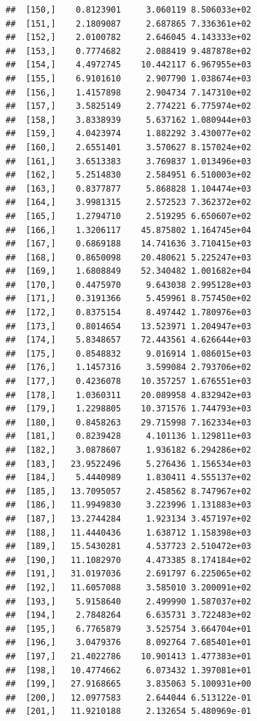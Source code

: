 \documentclass[article]{jss}\usepackage[]{graphicx}\usepackage[]{xcolor}
\makeatletter
\newenvironment{kframe}{%
 \def\at@end@of@kframe{}%
 \ifinner\ifhmode%
  \def\at@end@of@kframe{\end{minipage}}%
  \begin{minipage}{\columnwidth}%
 \fi\fi%
 \def\FrameCommand##1{\hskip\@totalleftmargin \hskip-\fboxsep
 \colorbox{shadecolor}{##1}\hskip-\fboxsep
     \hskip-\linewidth \hskip-\@totalleftmargin \hskip\columnwidth}%
 \MakeFramed {\advance\hsize-\width
   \@totalleftmargin\z@ \linewidth\hsize
   \@setminipage}}%
 {\par\unskip\endMakeFramed%
 \at@end@of@kframe}
\newenvironment{knitrout}{}{} %
\makeatother
\begin{document}
\begin{knitrout}
\begin{kframe}
\begin{verbatim}
##  [150,]    0.8123901     3.060119 8.506033e+02
##  [151,]    2.1809087     2.687865 7.336361e+02
##  [152,]    2.0100782     2.646045 4.143333e+02
##  [153,]    0.7774682     2.088419 9.487878e+02
##  [154,]    4.4972745    10.442117 6.967955e+03
##  [155,]    6.9101610     2.907790 1.038674e+03
##  [156,]    1.4157898     2.904734 7.147310e+02
##  [157,]    3.5825149     2.774221 6.775974e+02
##  [158,]    3.8338939     5.637162 1.080944e+03
##  [159,]    4.0423974     1.882292 3.430077e+02
##  [160,]    2.6551401     3.570627 8.157024e+02
##  [161,]    3.6513383     3.769837 1.013496e+03
##  [162,]    5.2514830     2.584951 6.510003e+02
##  [163,]    0.8377877     5.868828 1.104474e+03
##  [164,]    3.9981315     2.572523 7.362372e+02
##  [165,]    1.2794710     2.519295 6.650607e+02
##  [166,]    1.3206117    45.875802 1.164745e+04
##  [167,]    0.6869188    14.741636 3.710415e+03
##  [168,]    0.8650098    20.480621 5.225247e+03
##  [169,]    1.6808849    52.340482 1.001682e+04
##  [170,]    0.4475970     9.643038 2.995128e+03
##  [171,]    0.3191366     5.459961 8.757450e+02
##  [172,]    0.8375154     8.497442 1.780976e+03
##  [173,]    0.8014654    13.523971 1.204947e+03
##  [174,]    5.8348657    72.443561 4.626644e+03
##  [175,]    0.8548832     9.016914 1.086015e+03
##  [176,]    1.1457316     3.599084 2.793706e+02
##  [177,]    0.4236078    10.357257 1.676551e+03
##  [178,]    1.0360311    20.089958 4.832942e+03
##  [179,]    1.2298805    10.371576 1.744793e+03
##  [180,]    0.8458263    29.715998 7.162334e+03
##  [181,]    0.8239428     4.101136 1.129811e+03
##  [182,]    3.0878607     1.936182 6.294286e+02
##  [183,]   23.9522496     5.276436 1.156534e+03
##  [184,]    5.4440989     1.830411 4.555137e+02
##  [185,]   13.7095057     2.458562 8.747967e+02
##  [186,]   11.9949830     3.223996 1.131883e+03
##  [187,]   13.2744284     1.923134 3.457197e+02
##  [188,]   11.4440436     1.638712 1.158398e+03
##  [189,]   15.5430281     4.537723 2.510472e+03
##  [190,]   11.1082970     4.473385 8.174184e+02
##  [191,]   31.0197036     2.691797 6.225065e+02
##  [192,]   11.6057088     3.585010 3.200091e+02
##  [193,]    5.9158640     2.499990 1.587037e+02
##  [194,]    2.7848264     6.635731 3.722483e+02
##  [195,]    6.7765879     3.525754 3.664704e+01
##  [196,]    3.0479376     8.092764 7.685401e+01
##  [197,]   21.4022786    10.901413 1.477383e+01
##  [198,]   10.4774662     6.073432 1.397081e+01
##  [199,]   27.9168665     3.835063 5.100931e+00
##  [200,]   12.0977583     2.644044 6.513122e-01
##  [201,]   11.9210188     2.132654 5.480969e-01

\end{verbatim}
\end{kframe}
\end{knitrout}
\end{document}

